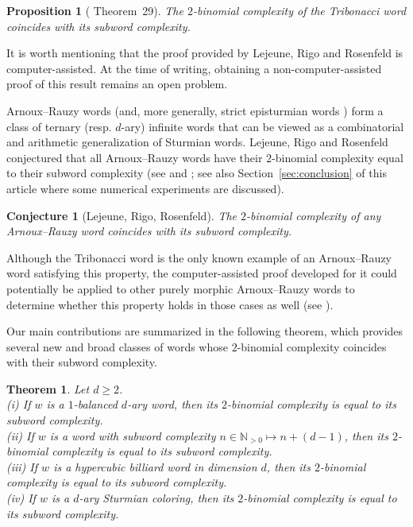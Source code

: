 \documentclass{template_arxiv}
\newtheorem{theorem}{Theorem}%
\newtheorem{proposition}[lemma]{Proposition}
\newtheorem{conjecture}[lemma]{Conjecture}
\theoremstyle{definition}
\newcommand{\N}{\mathbb{N}}
\begin{document}
\begin{proposition}[\cite{LRR20} Theorem~29]
The $2$-binomial complexity of the Tribonacci word coincides with its subword complexity.
\end{proposition}

It is worth mentioning that the proof provided by Lejeune, Rigo and Rosenfeld is computer-assisted. At the time of writing, obtaining a non-computer-assisted proof of this result remains an open problem.

\medskip

Arnoux--Rauzy words (and, more generally, strict episturmian words \cite{DJP01,GJ09}) form a class of ternary (resp. $d$-ary) infinite words that can be viewed as a combinatorial and arithmetic generalization of Sturmian words. Lejeune, Rigo and Rosenfeld conjectured that all Arnoux--Rauzy words have their $2$-binomial complexity equal to their subword complexity (see \cite{LRR20} and \cite[Chapter~4, Section~4.4 and Appendix~B]{LejPhD}; see also Section~\ref{sec:conclusion} of this article where some numerical experiments are discussed).

\begin{conjecture}[Lejeune, Rigo, Rosenfeld]
The $2$-binomial complexity of any Arnoux--Rauzy word coincides with its subword complexity.
\end{conjecture}

Although the Tribonacci word is the only known example of an Arnoux--Rauzy word satisfying this property, the computer-assisted proof developed for it could potentially be applied to other purely morphic Arnoux--Rauzy words to determine whether this property holds in those cases as well (see \cite[Section~6]{LRR20}).

\medskip

Our main contributions are summarized in the following theorem, which provides several new and broad classes of words whose $2$-binomial complexity coincides with their subword complexity.

\begin{theorem}\label{th:main}
Let $d\geq 2$.\\
\emph{(i)} If $w$ is a $1$-balanced $d$-ary word, then its $2$-binomial complexity is equal to its subword complexity.\\
\emph{(ii)} If $w$ is a word with subword complexity $n\in\N_{>0}\mapsto n+(d-1)$, then its $2$-binomial complexity is equal to its subword complexity.\\
\emph{(iii)} If $w$ is a hypercubic billiard word in dimension $d$, then its $2$-binomial complexity is equal to its subword complexity.\\
\emph{(iv)} If $w$ is a $d$-ary Sturmian coloring, then its $2$-binomial complexity is equal to its subword complexity. 
\end{theorem}
\end{document}
